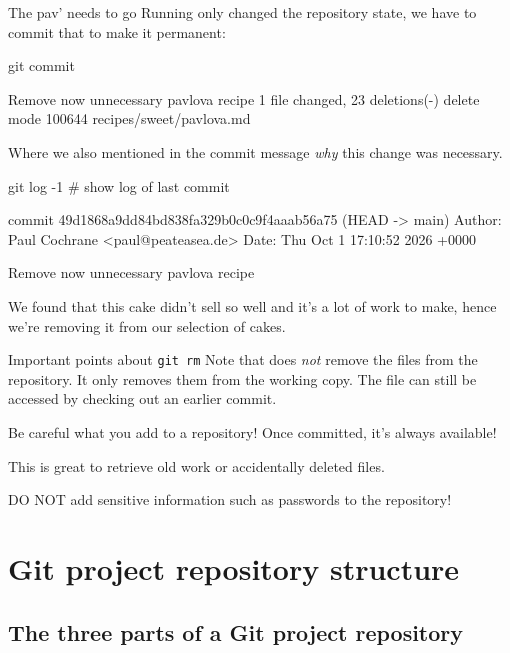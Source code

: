 \documentclass{git_course}
\begin{document}
\begin{frame}[fragile]{The pav' needs to go}
    Running  only changed the repository state, we have to
    commit that to make it permanent:
    \begin{shellcode}
        git commit
    \end{shellcode}
    \begin{outputcode}
[main 49d1868] Remove now unnecessary pavlova recipe
 1 file changed, 23 deletions(-)
 delete mode 100644 recipes/sweet/pavlova.md
    \end{outputcode}
    Where we also mentioned in the commit message \emph{why} this change was
    necessary.

    \begin{shellcode}
        git log -1  # show log of last commit
    \end{shellcode}
    \begin{outputcode}
commit 49d1868a9dd84bd838fa329b0c0c9f4aaab56a75 (HEAD -> main)
Author: Paul Cochrane <paul@peateasea.de>
Date:   Thu Oct 1 17:10:52 2026 +0000

    Remove now unnecessary pavlova recipe

    We found that this cake didn't sell so well and it's a lot of work to
    make, hence we're removing it from our selection of cakes.
    \end{outputcode}
\end{frame}

\begin{frame}[fragile]{Important points about \texttt{git rm}}
    Note that  does \emph{not} remove the files from the
    repository.  It only removes them from the working copy.  The file can
    still be accessed by checking out an earlier commit.

     Be careful what you add to a repository!  Once committed,
    it's always available!

     This is great to retrieve old work or accidentally
    deleted files.

     DO NOT add sensitive information such as passwords to
    the repository!
\end{frame}

\section{Git project repository structure}

\subsection{The three parts of a Git project repository}
\end{document}
